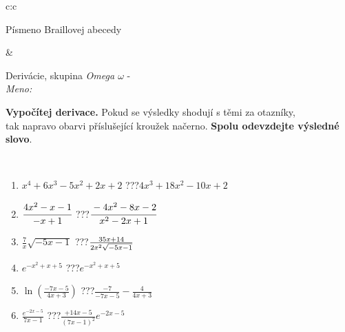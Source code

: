\documentclass[10pt]{report}
\begin{document}
\begin{tabular}{c:c}
\begin{minipage}[c][104.5mm][t]{0.5\linewidth}
\begin{center}
\begin{minipage}{0.20\linewidth}
\begin{center}
{\small Písmeno Braillovej abecedy}
\end{center}
\end{minipage}
\end{center}
\end{minipage}
&
\begin{minipage}[c][104.5mm][t]{0.5\linewidth}
\begin{center}
\vspace{7mm}
{\huge Derivácie, skupina \textit{Omega $\omega$} -}\\[5mm]
\textit{Meno:}\phantom{xxxxxxxxxxxxxxxxxxxxxxxxxxxxxxxxxxxxxxxxxxxxxxxxxxxxxxxxxxxxxxxxx}\\[5mm]
\begin{minipage}{0.95\linewidth}
\begin{center}
\textbf{Vypočítej derivace.} Pokud se výsledky shodují s těmi za otazníky,\\tak napravo obarvi příslušející kroužek načerno. \textbf{Spolu odevzdejte výsledné slovo}.
\end{center}
\end{minipage}
\\[1mm]
\begin{minipage}{0.79\linewidth}
\begin{center}
\begin{varwidth}{\linewidth}
\begin{enumerate}
\normalsize
\item $x^4+6x^3-5x^2+2x+2$\quad \dotfill\; ???\;\dotfill \quad $4x^3+18x^2-10x+2$
\item $\cfrac{4x^2-x-1}{-x+1}$\quad \dotfill\; ???\;\dotfill \quad $\cfrac{-4x^2-8x-2}{x^2-2x+1}$
\item $\frac{7}{x}\sqrt{-5x-1}$\quad \dotfill\; ???\;\dotfill \quad $\frac{35x+14}{2x^2 \sqrt{\smash[b]{-5x-1}}}$
\item $e^{-x^2+x+5}$\quad \dotfill\; ???\;\dotfill \quad $e^{-x^2+x+5}$
\item $\ln{\left(\frac{-7x-5}{4x+3}\right)}$\quad \dotfill\; ???\;\dotfill \quad $\frac{-7}{-7x-5}-\frac{4}{4x+3}$
\item $\frac{e^{-2x-5}}{7x-1}$\quad \dotfill\; ???\;\dotfill \quad $\frac{+14x-5}{(7x-1)^2}e^{-2x-5}$
\end{enumerate}
\end{varwidth}
\end{center}
\end{minipage}
\begin{minipage}{0.20\linewidth}
\begin{center}

\end{center}
\end{minipage}
\end{center}
\end{minipage}
\end{tabular}
\end{document}
